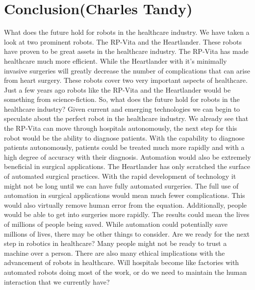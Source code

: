 \documentclass[11pt,conference]{IEEEtran}
\begin{document}
\section{Conclusion(Charles Tandy)}

\indent What does the future hold for robots in the healthcare industry. We have taken a look at two prominent robots. The RP-Vita and the Heartlander. These robots have proven to be great assets in the healthcare industry. The RP-Vita has made healthcare much more efficient. While the Heartlander with it's minimally invasive surgeries will greatly decrease the number of complications that can arise from heart surgery. These robots cover two very important aspects of healthcare. Just a few years ago robots like the RP-Vita and the Heartlander would be something from science-fiction. So, what does the future hold for robots in the healthcare industry?
\newline
\indent Given current and emerging technologies we can begin to speculate about the perfect robot in the healthcare industry. We already see that the RP-Vita can move through hospitals autonomously, the next step for this robot would be the ability to diagnose patients. With the capability to diagnose patients autonomously, patients could be treated much more rapidly and with a high degree of accuracy with their diagnosis. Automation would also be extremely beneficial in surgical applications. The Heartlander has only scratched the surface of automated surgical practices. With the rapid development of technology it might not be long until we can have fully automated surgeries. The full use of automation in surgical applications would mean much fewer complications. This would also virtually remove human error from the equation. Additionally, people would be able to get into surgeries more rapidly. The results could mean the lives of millions of people being saved. 
\newline
\indent While automation could potentially save millions of lives, there may be other things to consider. Are we ready for the next step in robotics in healthcare? Many people might not be ready to trust a machine over a person. There are also many ethical implications with the advancement of robots in healthcare. Will hospitals become like factories with automated robots doing most of the work, or do we need to maintain the human interaction that we currently have? 
\end{document}
